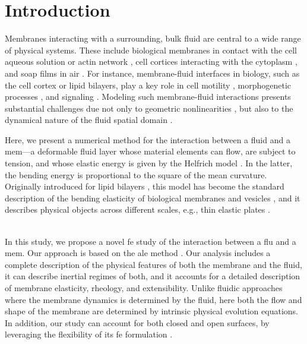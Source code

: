 \section{Introduction}
\label{sec_introduction}
\acresetall


Membranes interacting with a surrounding, bulk fluid are central to a wide range of physical systems. These include biological membranes in contact with the cell aqueous solution or actin network \cite{Bassereau_2018}, cell cortices interacting with the cytoplasm \cite{salbreuxActinCortexMechanics2012}, and soap films in air \cite{Pugh_2016}. For instance,  membrane-fluid interfaces in biology, such as the cell cortex or lipid bilayers, play a key role in cell motility \cite{sensMembraneTensionCytoskeleton2015}, morphogenetic processes \cite{salbreuxActinCortexMechanics2012}, and signaling \cite{diz-munozUseForceMembrane2013}.
Modeling such membrane-fluid interactions presents substantial challenges due not only  to  geometric nonlinearities \cite{worthmullerIRENEFluIdLayeR2025}, but also to the dynamical nature of the fluid spatial domain \cite{doneaChapter14Arbitrary2004}.

Here, we  present a numerical method for the interaction between a fluid and a \acl{mem}---a deformable fluid layer whose material elements can flow, are subject to tension, and whose elastic energy is given by the Helfrich model \cite{helfrichElasticPropertiesLipid1973}. In the latter, the bending energy is proportional to the square of the mean curvature. Originally introduced for lipid bilayers \cite{helfrichElasticPropertiesLipid1973}, this model has become the standard description of the bending elasticity of biological membranes and vesicles \cite{seifertConfigurationsFluidMembranes1997a}, and it describes physical objects across different scales, e.g., thin elastic plates \cite{landauTheoryElasticity1986}.


\vspace{0.5cm}\\

In this study, we propose a novel \ac{fe} study of the interaction between a \acl{flu} and a \acl{mem}. Our approach is based on the \ac{ale} method \cite{malvernIntroductionMechanicsContinuous1969,howellp.AppliedSolidMechanics2008,doneaChapter14Arbitrary2004}.
Our analysis  includes a complete description of the physical features of both the membrane and the fluid,  it can describe  inertial regimes of both, and it accounts for a detailed description of membrane elasticity, rheology, and extensibility. Unlike fluidic approaches where the membrane dynamics is determined by the fluid, here both the flow and shape of the membrane are determined by intrinsic physical evolution equations. In addition, our study can account for both closed and open surfaces, by leveraging the flexibility of its \ac{fe} formulation \cite{loggAutomatedSolutionDifferential2012}.

